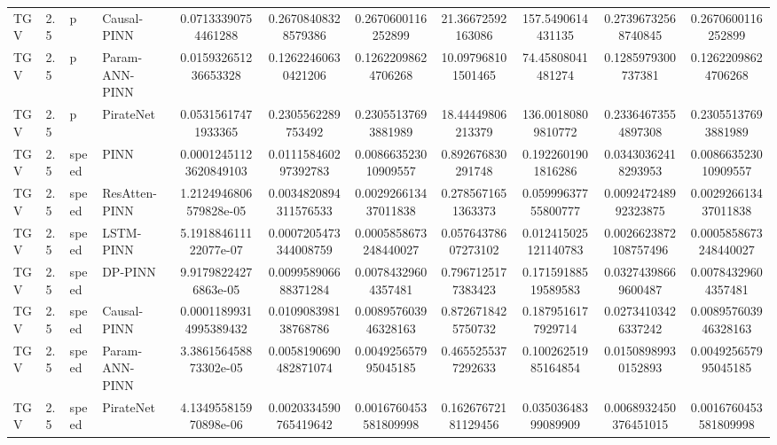 \begin{landscape}
\begin{table}[p]
{\begin{tabular}{llllccccccc}
TGV &    2.5 &     p &    Causal-PINN &    0.07133390754461288 &    0.26708408328579386 &     0.2670600116252899 &    21.36672592163086 &     157.5490614431135 &   0.27396732568740845 &     0.2670600116252899 \\
TGV &    2.5 &     p & Param-ANN-PINN &   0.015932651236653328 &    0.12622460630421206 &    0.12622098624706268 &   10.097968101501465 &     74.45808041481274 &    0.1285979300737381 &    0.12622098624706268 \\
TGV &    2.5 &     p &      PirateNet &    0.05315617471933365 &     0.2305562289753492 &    0.23055137693881989 &    18.44449806213379 &    136.00180809810772 &   0.23364673554897308 &    0.23055137693881989 \\
TGV &    2.5 & speed &           PINN & 0.00012451123620849103 &   0.011158460297392783 &   0.008663523010909557 &    0.892676830291748 &    0.1922601901816286 &   0.03430362418293953 &   0.008663523010909557 \\
TGV &    2.5 & speed &  ResAtten-PINN & 1.2124946806579828e-05 &  0.0034820894311576533 &   0.002926613437011838 &   0.2785671651363373 &   0.05999637755800777 &  0.009247248992323875 &   0.002926613437011838 \\
TGV &    2.5 & speed &      LSTM-PINN &  5.191884611122077e-07 &  0.0007205473344008759 &  0.0005858673248440027 &  0.05764378607273102 &  0.012415025121140783 & 0.0026623872108757496 &  0.0005858673248440027 \\
TGV &    2.5 & speed &        DP-PINN &   9.91798224276863e-05 &   0.009958906688371284 &    0.00784329604357481 &   0.7967125177383423 &   0.17159188519589583 &   0.03274398669600487 &    0.00784329604357481 \\
TGV &    2.5 & speed &    Causal-PINN & 0.00011899314995389432 &   0.010908398138768786 &   0.008957603946328163 &   0.8726718425750732 &    0.1879516177929714 &   0.02734103426337242 &   0.008957603946328163 \\
TGV &    2.5 & speed & Param-ANN-PINN &  3.386156458873302e-05 &  0.0058190690482871074 &   0.004925657995045185 &   0.4655255377292633 &   0.10026251985164854 &   0.01508989930152893 &   0.004925657995045185 \\
TGV &    2.5 & speed &      PirateNet &  4.134955815970898e-06 &  0.0020334590765419642 &  0.0016760453581809998 &  0.16267672181129456 &   0.03503648399089909 & 0.0068932450376451015 &  0.0016760453581809998 \\
\bottomrule
\end{tabular}%
}
\end{table}
\end{landscape}
